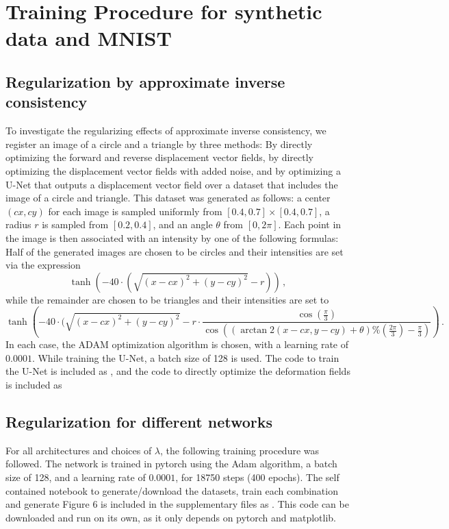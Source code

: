 \documentclass[10pt,onecolumn,letterpaper]{article} %
\begin{document}
\section{Training Procedure for synthetic data and MNIST}
\subsection{Regularization by approximate inverse consistency}
To investigate the regularizing effects of approximate inverse consistency, we register an image of a circle and a triangle by three methods: By directly optimizing the forward and reverse displacement vector fields, by directly optimizing the displacement vector fields with added noise, and by optimizing a U-Net that outputs a displacement vector field over a dataset that includes the image of a circle and triangle. This dataset was generated as follows: 
a center $(cx, cy)$ for each image is sampled uniformly from $[0.4, 0.7] \times [0.4, 0.7]$, a radius $r$ is sampled from $[0.2, 0.4]$, and an angle $\theta$ from $[0, 2 \pi]$. Each point in the image is then associated with an intensity by one of the following formulas:
Half of the generated images are chosen to be circles and their intensities are set via the expression
\begin{equation}
    \tanh\left(- 40 \cdot (\sqrt{(x - cx)^2 + (y - cy)^2} - r)\right) \,,
\end{equation}
while the remainder are chosen to be triangles and their intensities are set to
\begin{equation}
\tanh\left(-40 \cdot (\sqrt{(x - cx)^2 + (y - cy)^2}
    - r \cdot \frac{\cos(\frac{\pi}{3}) }{ \cos((\arctan2(x - cx, y - cy) + \theta) \% (\frac{2 \pi}{ 3}) - \frac{\pi}{ 3})}\right) \,.
\end{equation}
In each case, the ADAM optimization algorithm is chosen, with a learning rate of $0.0001$. While training the U-Net, a batch size of 128 is used. The code to train the U-Net is included as , and the code to directly optimize the deformation fields is included as 
\subsection{Regularization for different networks}
For all architectures and choices of $\lambda$, the following training procedure was followed. The network is trained in pytorch using the Adam algorithm, a batch size of 128, and a learning rate of $0.0001$, for 18750 steps (400 epochs). The self contained notebook to generate/download the datasets, train each combination and generate Figure 6 is included in the supplementary files as . This code can be downloaded and run on its own, as it only depends on pytorch and matplotlib.
\end{document}
